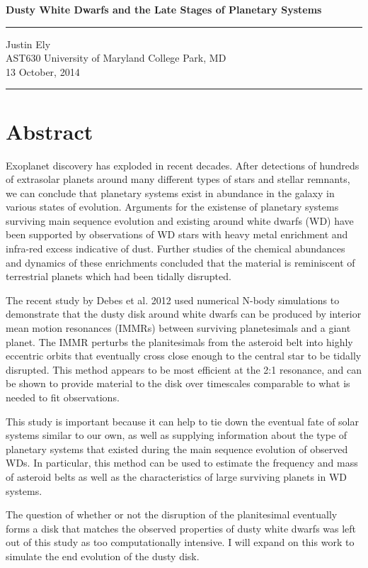 \documentclass[a4paper,11pt]{article}
\begin{document}
\begin{flushright}

\vspace{1.1cm}

{\bf\large Dusty White Dwarfs and the Late Stages of Planetary Systems}

\rule{0.25\linewidth}{0.5pt}

\vspace{0.1cm}
Justin Ely \\
\vspace{0.1cm}
\footnotesize{AST630 University of Maryland College Park, MD\\}
\vspace{0.1cm}
13 October, 2014
\end{flushright}

\noindent\rule{\linewidth}{1.0pt}
\section*{Abstract}
Exoplanet discovery has exploded in recent decades.  After detections of 
hundreds of extrasolar planets around many different types of stars and stellar
remnants, we can conclude that planetary systems exist in abundance in 
the galaxy in various states of evolution.  Arguments for the existense of planetary systems surviving main sequence 
evolution and existing around white dwarfs (WD) have been 
supported by observations of WD stars with heavy metal enrichment and infra-red
excess indicative of dust.  Further studies of the chemical abundances  and 
dynamics of these
enrichments concluded that the material is reminiscent of terrestrial planets 
which had been tidally disrupted. 

The recent study by Debes et al. 2012 used numerical N-body simulations to 
demonstrate that the dusty disk around white dwarfs can be produced by 
interior mean motion resonances (IMMRs) between surviving planetesimals and
 a giant planet.  The IMMR 
perturbs the planitesimals from the asteroid belt into highly eccentric orbits 
that eventually cross close enough to the central star to be tidally disrupted. 
This method appears to be most efficient at the 2:1 resonance, and can be shown
to provide material to the disk over timescales comparable to what is needed
to fit observations.

This study is important because it can help to tie down the eventual fate of 
solar systems similar to our own, as well as supplying information about the 
type of planetary systems that existed during the main sequence evolution of 
observed WDs.  
In particular, this method can be used to estimate the frequency and mass of 
asteroid belts as well as the characteristics of large surviving planets in WD
systems.

The question of whether or not the disruption of the planitesimal eventually 
forms a disk that matches the observed properties of dusty white dwarfs was left
 out of this study as too computationally intensive.  I will expand on this 
work to simulate the end evolution of the dusty disk.
\end{document}
